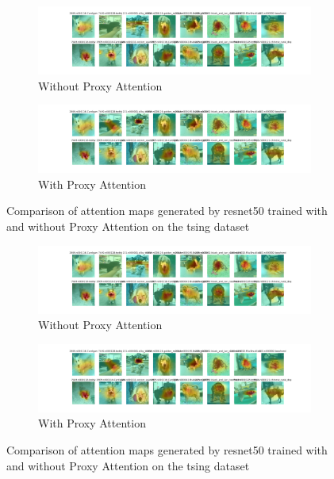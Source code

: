     \begin{figure}[H]
        \centering
        \begin{subfigure}[b]{1\textwidth}
            \includegraphics[width=\textwidth]{images/gpp_tsing_resnet50_noproxy_0.pdf}
            \caption{Without Proxy Attention}
        \end{subfigure}
        \hfill
        \begin{subfigure}[b]{1\textwidth}
            \includegraphics[width=\textwidth]{images/gpp_tsing_resnet50_proxy_0.pdf}
            \caption{With Proxy Attention}
        \end{subfigure}
        \caption{Comparison of attention maps generated by resnet50 trained with and without Proxy Attention on the tsing dataset}
    \end{figure}
    

    \begin{figure}[H]
        \centering
        \begin{subfigure}[b]{1\textwidth}
            \includegraphics[width=\textwidth]{images/gpp_tsing_resnet50_noproxy_0.pdf}
            \caption{Without Proxy Attention}
        \end{subfigure}
        \hfill
        \begin{subfigure}[b]{1\textwidth}
            \includegraphics[width=\textwidth]{images/gpp_tsing_resnet50_proxy_0.pdf}
            \caption{With Proxy Attention}
        \end{subfigure}
        \caption{Comparison of attention maps generated by resnet50 trained with and without Proxy Attention on the tsing dataset}
    \end{figure}
    
